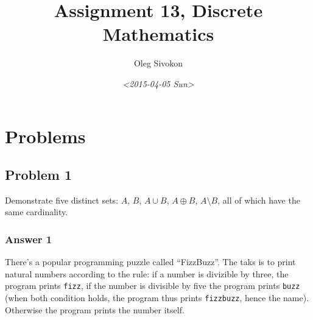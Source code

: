\documentclass[11pt]{article}
\author{Oleg Sivokon}
\date{\textit{<2015-04-05 Sun>}}
\title{Assignment 13, Discrete Mathematics}
\begin{document}
\maketitle
\tableofcontents



\clearpage

\section{Problems}
\label{sec-1}

\subsection{Problem 1}
\label{sec-1-1}
Demonstrate five distinct sets: $A$, $B$, $A \cup B$, $A \oplus B$, $A \setminus B$,
all of which have the same cardinality.

\subsubsection{Answer 1}
\label{sec-1-1-1}
There's a popular programming puzzle called ``FizzBuzz''.  The taks is to
print natural numbers according to the rule: if a number is divizible by
three, the program prints \texttt{fizz}, if the number is divisible by five the
program prints \texttt{buzz} (when both condition holds, the program thus prints
\texttt{fizzbuzz}, hence the name).  Otherwise the program prints the number itself.
\end{document}
